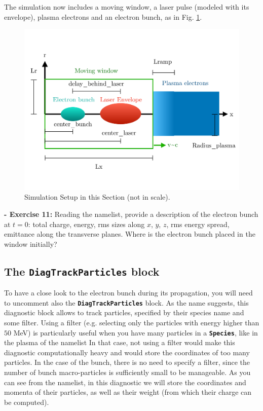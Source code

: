 \documentclass[a4paper,12pt]{extarticle}
\newcommand{\commandline}[1]{\texttt{\textbf{#1}}}
\begin{document}
The simulation now includes a moving window, a laser pulse (modeled with its envelope), plasma electrons and an electron bunch, as in Fig. \ref{Schema3}.\\

\begin{figure}[h!]
  \begin{center}
  \includegraphics[scale=0.3]{Schema_Simulation_3.pdf}
  \end{center}
  \caption{Simulation Setup in this Section (not in scale).}
  \label{Schema3}
\end{figure}

\textbf{ - Exercise 11:} Reading the namelist, provide a description of the electron bunch at $t=0$: total charge, energy, rms sizes along $x$, $y$, $z$, rms energy spread, emittance  along the transverse planes. Where is the electron bunch placed in the window initially? \\

\subsection*{The \commandline{DiagTrackParticles} block}
To have a close look to the electron bunch during its propagation,  you will need to uncomment also the \commandline{DiagTrackParticles} block. As the name suggests, this diagnostic block allows to track particles, specified by their species name and some filter. Using a filter (e.g. selecting only the particles with energy higher than $50$ MeV) is particularly useful when you have many particles in a \commandline{Species}, like in the plasma of the namelist In that case, not using a filter would make this diagnostic computationally heavy and would store the coordinates of too many particles. In the case of the bunch, there is no need to specify a filter, since the number of bunch macro-particles is sufficiently small to be manageable. As you can see from the namelist, in this diagnostic we will store the coordinates and momenta of their particles, as well as their weight (from which their charge can be computed). \\
\end{document}
